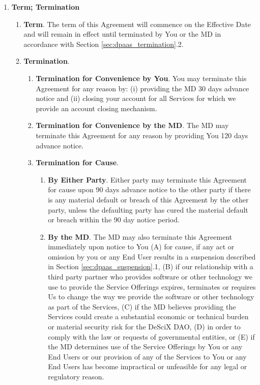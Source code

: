 \documentclass{article}
\begin{document}
\begin{enumerate}
    \item \textbf{Term; Termination} \label{sec:dpaas_termination}
    
    \begin{enumerate}
        \item \textbf{Term}. The term of this Agreement will commence on the Effective Date and will remain in effect until terminated by You or the MD in accordance with Section \ref{sec:dpaas_termination}.2.
        \item \textbf{Termination}.
        \begin{enumerate}
            \item \textbf{Termination for Convenience by You}. You may terminate this Agreement for any reason by: (i) providing the MD 30 days advance notice and (ii) closing your account for all Services for which we provide an account closing mechanism.
            \item \textbf{Termination for Convenience by the MD}. The MD may terminate this Agreement for any reason by providing You 120 days advance notice.
            \item \textbf{Termination for Cause}.
            \begin{enumerate}
                \item \textbf{By Either Party}. Either party may terminate this Agreement for cause upon 90 days advance notice to the other party if there is any material default or breach of this Agreement by the other party, unless the defaulting party has cured the material default or breach within the 90 day notice period.
                \item \textbf{By the MD}. The MD may also terminate this Agreement immediately upon notice to You (A) for cause, if any act or omission by you or any End User results in a suspension described in Section \ref{sec:dpaas_suspension}.1, (B) if our relationship with a third party partner who provides software or other technology we use to provide the Service Offerings expires, terminates or requires Us to change the way we provide the software or other technology as part of the Services, (C) if the MD believes providing the Services could create a substantial economic or technical burden or material security risk for the DeSciX DAO, (D) in order to comply with the law or requests of governmental entities, or (E) if the MD determines use of the Service Offerings by You or any End Users or our provision of any of the Services to You or any End Users has become impractical or unfeasible for any legal or regulatory reason.
            \end{enumerate}
        \end{enumerate}
    \end{enumerate}


\end{enumerate}
\end{document}
